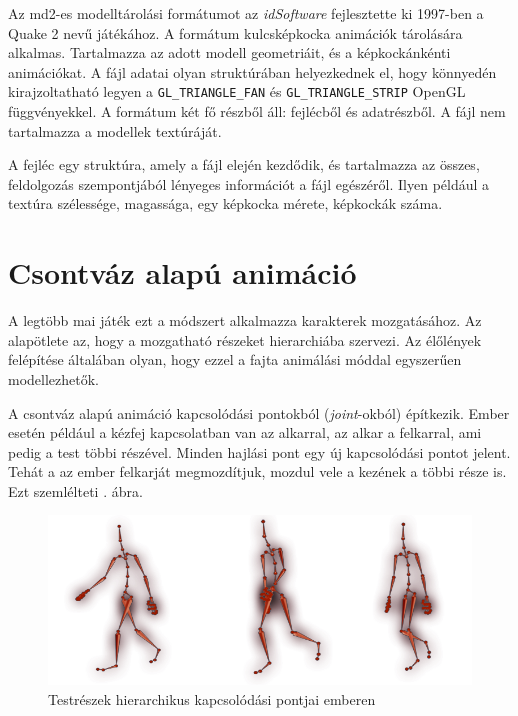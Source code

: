 
Az md2-es modelltárolási formátumot az \textit{idSoftware} fejlesztette ki 1997-ben a Quake 2 nevű játékához. A formátum kulcsképkocka animációk tárolására alkalmas. Tartalmazza az adott modell geometriáit, és a képkockánkénti animációkat. A fájl adatai olyan struktúrában helyezkednek el, hogy könnyedén kirajzoltatható legyen a \texttt{GL\_TRIANGLE\_FAN} és \texttt{GL\_TRIANGLE\_STRIP} OpenGL függvényekkel. A formátum két fő részből áll: fejlécből és adatrészből. A fájl nem tartalmazza a modellek textúráját.

A fejléc egy struktúra, amely a fájl elején kezdődik, és tartalmazza az összes, feldolgozás szempontjából lényeges információt a fájl egészéről. Ilyen például a textúra szélessége, magassága, egy képkocka mérete, képkockák száma.

\section{Csontváz alapú animáció}

A legtöbb mai játék ezt a módszert alkalmazza karakterek mozgatásához. Az alapötlete az, hogy a mozgatható részeket hierarchiába szervezi. Az élőlények felépítése általában olyan, hogy ezzel a fajta animálási móddal egyszerűen modellezhetők. 

A csontváz alapú animáció kapcsolódási pontokból (\textit{joint}-okból) építkezik. Ember esetén például a kézfej kapcsolatban van az alkarral, az alkar a felkarral, ami pedig a test többi részével. Minden hajlási pont egy új kapcsolódási pontot jelent. Tehát a az ember felkarját megmozdítjuk, mozdul vele a kezének a többi része is. Ezt szemlélteti . ábra.

\begin{figure}[h]
\centering
\includegraphics[scale=0.5]{kepek/skeletal_anim.png}
\caption[]{Testrészek hierarchikus kapcsolódási pontjai emberen\footnotemark}
\label{fig:skeletal}
\end{figure}

